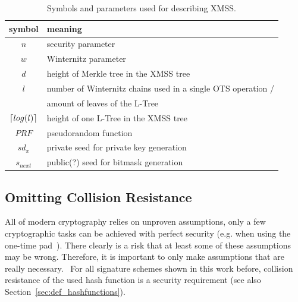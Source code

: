 \begin{table}
\begin{center}
\begin{tabular}{c l} 
 \hline
 symbol & meaning  \\ 
 \hline
 $n$ & security parameter \\ %
 $w$ & Winternitz parameter  \\ 
 $d$ & height of Merkle tree in the XMSS tree  \\ 
 $l$ & number of Winternitz chains used in a single OTS operation / \\ 
     & amount of leaves of the L-Tree \\ 
 $\lceil log(l)\rceil$ & height of one L-Tree in the XMSS tree \\
 $PRF$ & pseudorandom function \\
 $sd_x$ & private seed for private key generation \\
 $s_{next}$ & public(?) seed for bitmask generation  \\
 \hline
\end{tabular}
\caption{Symbols and parameters used for describing XMSS.}
\label{table:xmms_param}
\end{center}
\end{table}

\subsection{Omitting Collision Resistance}
All of modern cryptography relies on unproven assumptions, only a few cryptographic tasks can be achieved with perfect security (e.g. when using the one-time pad~\cite{one_time_pad_2013}). There clearly is a risk that at least some of these assumptions may be wrong. Therefore, it is important to only make assumptions that are really necessary.~\cite{minimal_security_assump_phd_2016}
For all signature schemes shown in this work before, collision resistance of the used hash function is a security requirement (see also Section~\ref{sec:def_hashfunctions}). 

